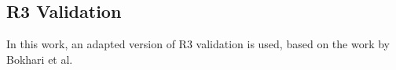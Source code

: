 \subsection{R3 Validation}

In this work, an adapted version of R3 validation is used, based on the work by Bokhari et al.\cite*[]{Bokhari2020r3}



